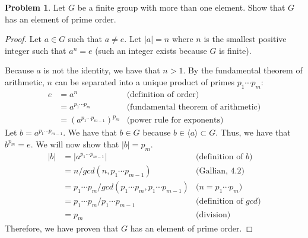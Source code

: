 \documentclass[12pt,reqno]{article}
\theoremstyle{plain}
\theoremstyle{definition}
\newtheorem{problem}{Problem}
\begin{document}
\newpage


\begin{problem} 
    Let $G$ be a finite group with more than one element. Show that $G$ has an element of prime order.
\end{problem}

\begin{proof}
    Let \(a\in G\) such that \(a\neq e\). Let \(|a| = n\) where \(n\) is the smallest positive
    integer such that \(a^n = e\) (such an integer exists because \(G\) is finite). 
    
    Because \(a\) is not the identity, we have that \(n > 1\). By the fundamental theorem of arithmetic,
    \(n\) can be separated into a unique product of primes \(p_1\cdots p_m\):
    \begin{align*}
        e &= a^n & \text{(definition of order)}\\
        &= a^{p_1\cdots p_m} & \text{(fundamental theorem of arithmetic)}\\
        &= (a^{p_1\cdots p_{m-1}})^{p_m} & \text{(power rule for exponents)}
    \end{align*}
    Let \(b = a^{p_1\cdots p_{m-1}}\). We have that \(b\in G\) because \(b\in \langle a\rangle \subset G\). Thus,
    we have that \(b^{p_m} = e\). We will now show that \(|b| = p_m\).
    \begin{align*}
        |b| &= |a^{p_1\cdots p_{m-1}}| & \text{(definition of \(b\))}\\
        &= n / gcd(n, p_1\cdots p_{m-1}) & \text{(Gallian, 4.2)}\\
        &= p_1\cdots p_m / gcd(p_1\cdots p_m, p_1\cdots p_{m-1}) & \text{(\(n=p_1\cdots p_m\))}\\
        &= p_1\cdots p_m / p_1\cdots p_{m-1} & \text{(definition of \(gcd\))}\\
        &= p_m & \text{(division)}
    \end{align*}
    Therefore, we have proven that \(G\) has an element of prime order.
\end{proof}
\end{document}

